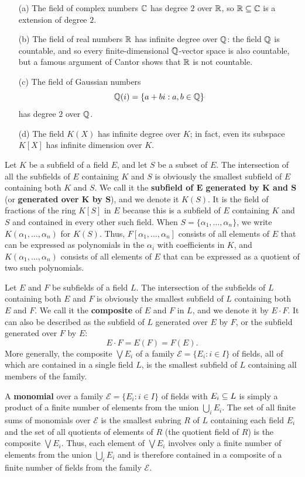 \begin{example}
\mbox{}
\begin{itemize}
\item[(a)] The field of complex numbers $\mathbb{C}$ has degree $2$ over $\mathbb{R}$, so $\mathbb{R}\subseteq\mathbb{C}$ is a extension of degree $2$.
\item[(b)] The field of real numbers $\mathbb{R}$ has infinite degree over $\mathbb{Q}$: the field $\mathbb{Q}$ is countable, and so every finite-dimensional $\mathbb{Q}$-vector space is also countable, but a famous argument of Cantor shows that $\mathbb{R}$ is not countable.
\item[(c)] The field of Gaussian numbers
\[\mathbb{Q}(i)=\{a+bi:a,b\in\mathbb{Q}\}\]
has degree $2$ over $\mathbb{Q}$.
\item[(d)] The field $K(X)$ has infinite degree over $K$; in fact, even its subspace $K[X]$ has infinite dimension over $K$.
\end{itemize}
\end{example}
Let $K$ be a subfield of a field $E$, and let $S$ be a subset of $E$. The intersection of all the subfields of $E$ containing $K$ and $S$ is obviously the smallest subfield of $E$ containing both $K$ and $S$. We call it the \textbf{subfield of $\bm{E}$ generated by $\bm{K}$ and $\bm{S}$} (or \textbf{generated over $\bm{K}$ by $\bm{S}$}), and we denote it $K(S)$. It is the field of fractions of the ring $K[S]$ in $E$ because this is a subfield of $E$ containing $K$ and $S$ and contained
in every other such field. When $S=\{\alpha_1,\dots,\alpha_n\}$, we write $K(\alpha_1,\dots,\alpha_n)$ for $K(S)$. Thus, $F[\alpha_1,\dots,\alpha_n]$ consists of all elements of $E$ that can be expressed as polynomials in the $\alpha_i$ with coefficients in $K$, and $K(\alpha_1,\dots,\alpha_n)$ consists of all elements of $E$ that can be expressed
as a quotient of two such polynomials.\par
Let $E$ and $F$ be subfields of a field $L$. The intersection of the subfields of $L$ containing both $E$ and $F$ is obviously the smallest subfield of $L$ containing both $E$ and $F$. We call it the \textbf{composite} of $E$ and $F$ in $L$, and we denote it by $E\cdot F$. It can also be described as the subfield of $L$ generated over $E$ by $F$, or the subfield generated over $F$ by $E$:
\[E\cdot F=E(F)=F(E).\]
More generally, the composite $\bigvee E_i$ of a family $\mathcal{E}=\{E_i:i\in I\}$ of fields, all of which are contained in a single field $L$, is the smallest subfield of $L$ containing all members of the family.\par
A \textbf{monomial} over a family $\mathcal{E}=\{E_i:i\in I\}$ of fields with $E_i\subseteq L$ is simply a product of a finite number of elements from the union $\bigcup_i E_i$. The set of all finite sums of monomials over $\mathcal{E}$ is the smallest subring $R$ of $L$ containing each field $E_i$ and the set of all quotients of elements of $R$ (the quotient field of $R$) is the composite $\bigvee E_i$. Thus, each element of $\bigvee E_i$ involves only a finite number of elements from the union $\bigcup_iE_i$ and is therefore contained in a composite of a finite number of fields from the family $\mathcal{E}$.\par
